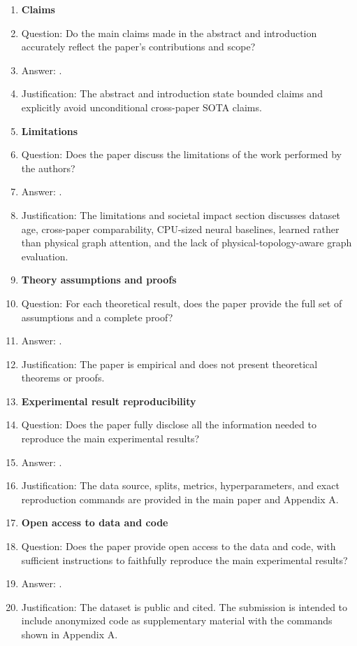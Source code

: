 \documentclass{article}
\begin{document}
\begin{enumerate}
\item {\bf Claims}
    \item[] Question: Do the main claims made in the abstract and introduction accurately reflect the paper's contributions and scope?
    \item[] Answer: \answerYes{}.
    \item[] Justification: The abstract and introduction state bounded claims and explicitly avoid unconditional cross-paper SOTA claims.

\item {\bf Limitations}
    \item[] Question: Does the paper discuss the limitations of the work performed by the authors?
    \item[] Answer: \answerYes{}.
    \item[] Justification: The limitations and societal impact section discusses dataset age, cross-paper comparability, CPU-sized neural baselines, learned rather than physical graph attention, and the lack of physical-topology-aware graph evaluation.

\item {\bf Theory assumptions and proofs}
    \item[] Question: For each theoretical result, does the paper provide the full set of assumptions and a complete proof?
    \item[] Answer: \answerNA{}.
    \item[] Justification: The paper is empirical and does not present theoretical theorems or proofs.

\item {\bf Experimental result reproducibility}
    \item[] Question: Does the paper fully disclose all the information needed to reproduce the main experimental results?
    \item[] Answer: \answerYes{}.
    \item[] Justification: The data source, splits, metrics, hyperparameters, and exact reproduction commands are provided in the main paper and Appendix A.

\item {\bf Open access to data and code}
    \item[] Question: Does the paper provide open access to the data and code, with sufficient instructions to faithfully reproduce the main experimental results?
    \item[] Answer: \answerYes{}.
    \item[] Justification: The dataset is public and cited. The submission is intended to include anonymized code as supplementary material with the commands shown in Appendix A.


\end{enumerate}
\end{document}
